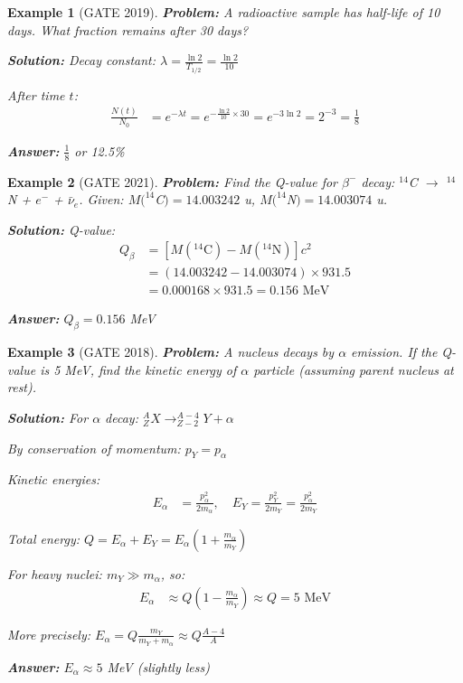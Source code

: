 \documentclass[12pt,a4paper]{article}
\newtheorem{example}{Example}[section]
\newcommand{\ans}[1]{\textcolor{red!70!black}{\textbf{Answer:} #1}}
\newcommand{\sol}{\textcolor{blue!70!black}{\textbf{Solution:}}}
\begin{document}
\begin{example}[GATE 2019]
\textbf{Problem:} A radioactive sample has half-life of 10 days. What fraction remains after 30 days?

\sol
Decay constant: $\lambda = \frac{\ln 2}{T_{1/2}} = \frac{\ln 2}{10}$

After time $t$:
\begin{align}
\frac{N(t)}{N_0} &= e^{-\lambda t} = e^{-\frac{\ln 2}{10} \times 30} = e^{-3\ln 2} = 2^{-3} = \frac{1}{8}
\end{align}

\ans{$\frac{1}{8}$ or 12.5\%}
\end{example}

\begin{example}[GATE 2021]
\textbf{Problem:} Find the Q-value for $\beta^-$ decay: $^{14}$C $\to$ $^{14}$N + $e^-$ + $\bar{\nu}_e$. Given: $M(^{14}$C$) = 14.003242$ u, $M(^{14}$N$) = 14.003074$ u.

\sol
Q-value:
\begin{align}
Q_\beta &= [M(^{14}\text{C}) - M(^{14}\text{N})]c^2\\
&= (14.003242 - 14.003074) \times 931.5\\
&= 0.000168 \times 931.5 = 0.156 \text{ MeV}
\end{align}

\ans{$Q_\beta = 0.156$ MeV}
\end{example}

\begin{example}[GATE 2018]
\textbf{Problem:} A nucleus decays by $\alpha$ emission. If the Q-value is 5 MeV, find the kinetic energy of $\alpha$ particle (assuming parent nucleus at rest).

\sol
For $\alpha$ decay: $^A_Z X \to ^{A-4}_{Z-2} Y + \alpha$

By conservation of momentum: $p_Y = p_\alpha$

Kinetic energies:
\begin{align}
E_\alpha &= \frac{p_\alpha^2}{2m_\alpha}, \quad E_Y = \frac{p_Y^2}{2m_Y} = \frac{p_\alpha^2}{2m_Y}
\end{align}

Total energy: $Q = E_\alpha + E_Y = E_\alpha\left(1 + \frac{m_\alpha}{m_Y}\right)$

For heavy nuclei: $m_Y \gg m_\alpha$, so:
\begin{align}
E_\alpha &\approx Q \left(1 - \frac{m_\alpha}{m_Y}\right) \approx Q = 5 \text{ MeV}
\end{align}

More precisely: $E_\alpha = Q \frac{m_Y}{m_Y + m_\alpha} \approx Q \frac{A-4}{A}$

\ans{$E_\alpha \approx 5$ MeV (slightly less)}
\end{example}
\end{document}
